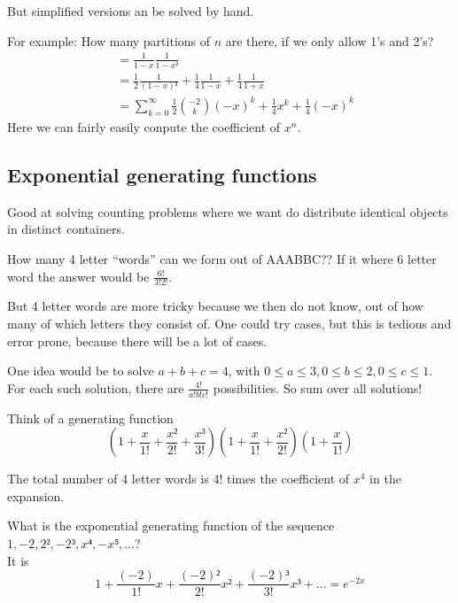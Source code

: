\documentclass[english]{lbscript}
\begin{document}
But simplified versions an be solved by hand.

For example: How many partitions of \(n\) are there, if we only allow 1's and 2's?
\begin{align}
  \label{eq:44}
   & = \frac{1}{1-x} \frac{1}{1-x²}                                                             \\
   & = \frac{1}{2} \frac{1}{(1-x)²} + \frac{1}{4} \frac{1}{1-x} + \frac{1}{4} \frac{1}{1+x}     \\
   & = ∑_{k=0}^{∞} \frac{1}{2} \binom{-2}{k} (-x)^{k} + \frac{1}{4} x^{k} + \frac{1}{4}(-x)^{k}
\end{align}
Here we can fairly easily conpute the coefficient of \(x^{n}\).


\subsection{Exponential generating functions}
\label{sec:expon-gener-funct}

Good at solving counting problems where we want do distribute identical objects in distinct containers.

\begin{example}{How many 4 letter \enquote{words} can we form out of AAABBC??}{}
  If it where 6 letter word the answer would be \(\frac{6!}{3!2!}\).

  But 4 letter words are more tricky because we then do not know, out of how many of which letters they consist of. One could try cases, but this is tedious and error prone, because there will be a lot of cases.

  One idea would be to solve \(a+b+c=4\), with \(0≤a≤3,0≤b≤2, 0≤c≤1\).\\
  For each such solution, there are \(\frac{4!}{a!b!c!}\) possibilities. So sum over all solutions!

  Think of a generating function
  \begin{equation}
    \label{eq:45}
    \left(1+ \frac{x}{1!} + \frac{x²}{2!} + \frac{x³}{3!} \right) \left(1+\frac{x}{1!} + \frac{x²}{2!} \right)  \left(1+ \frac{x}{1!} \right)
  \end{equation}

  The total number of 4 letter words is \(4!\) times the coefficient of \(x^{4}\) in the expansion.
\end{example}

\begin{example}{}{}
  What is the exponential generating function of the sequence \(1, -2, 2², -2³,x⁴,-x⁵,\dots\)?\\
  It is
  \begin{equation}
    \label{eq:46}
    1+ \frac{(-2)}{1!}x + \frac{(-2)²}{2!}x² + \frac{(-2)³}{3!}x³+\dots=e^{-2x}
  \end{equation}
\end{example}
\end{document}
